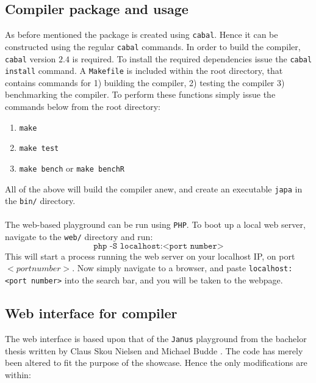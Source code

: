 \subsection{Compiler package and usage }
As before mentioned the \lan package is created using \texttt{cabal}. Hence it can be constructed
using the regular \texttt{cabal} commands.
In order to build the compiler, \texttt{cabal} version $2.4$ is required. To install the
required dependencies issue the \texttt{cabal install} command.
A \texttt{Makefile} is included within
the root directory, that contains commands for 1) building the compiler, 2) testing the compiler
3) benchmarking the compiler. To perform these functions simply issue the commands below from
the root directory:
\begin{enumerate}
    \item \texttt{make}
    \item \texttt{make test}
    \item \texttt{make bench} or \texttt{make benchR}
\end{enumerate}
\noindent
All of the above will build the compiler anew, and create an executable \texttt{japa} in the
\texttt{bin/} directory.
\\
\\
The web-based \lan playground can be run using \texttt{PHP}. To boot up a local web server,
navigate to the \texttt{web/} directory and run:
$$\texttt{php -S localhost:<port number>}$$
\noindent
This will start a process running the web server on your localhost IP, on port $<port number>$.
Now simply navigate to a browser, and paste \texttt{localhost:<port number>} into the search bar,
and you will be taken to the webpage.

\subsection{Web interface for compiler }
The web interface is based upon that of the \texttt{Janus} playground \cite{janusInterp} from
the bachelor thesis written by Claus Skou Nielsen and Michael Budde \cite{janusPlayground}.
The code has merely been altered to fit the purpose of the \lan showcase. Hence the only
modifications are within:

